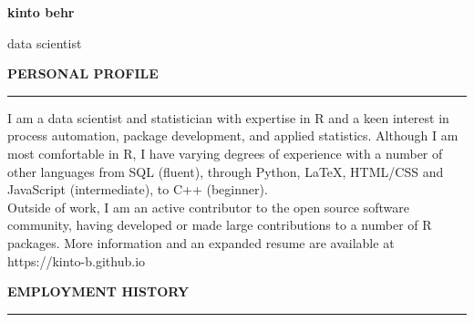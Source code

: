 \documentclass[10pt]{article}
\begin{document}
\lsstyle

\pagecolor{skyblue}

\newcommand{\stub}{\textcolor{skyblue}{\rule{3cm}{3mm}}}

\begin{huge}\begin{center}{\bf kinto behr}\end{center}\end{huge}
\begin{Large}\begin{center}{data scientist}\end{center}\end{Large}
\vspace{1cm}

\begin{large}
{\bf PERSONAL PROFILE} \\
\textcolor{gray}{\rule{2cm}{2mm}}
\end{large}
\vspace{5pt}

\begin{small}
I am a data scientist and statistician with expertise in R and a keen interest in process automation, package development, and applied statistics. Although I am most comfortable in R, I have varying degrees of experience with a number of other languages from SQL (fluent), through Python, LaTeX, HTML/CSS and JavaScript (intermediate), to C++ (beginner). \\

Outside of work, I am an active contributor to the open source software community, having developed or made large contributions to a number of R packages. More information and an expanded resume are available at https://kinto-b.github.io

\end{small}

\vspace{1cm}
\begin{large}
{\bf EMPLOYMENT HISTORY} \\
\textcolor{gray}{\rule{2cm}{2mm}}
\end{large}
\vspace{5pt}
\end{document}

